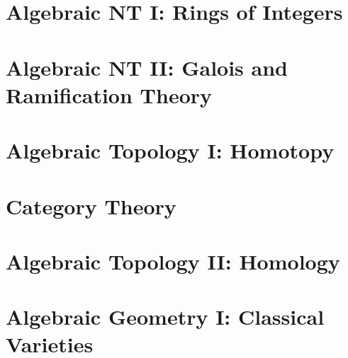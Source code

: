 \documentclass[11pt,twoside=semi,openright,numbers=noenddot]{scrbook}
\begin{document}
\part{Algebraic NT I: Rings of Integers}
\label{part:algnt1}
\parttoc







\part{Algebraic NT II: Galois and Ramification Theory}
\label{part:algnt2}
\parttoc





\part{Algebraic Topology I: Homotopy}
\label{part:algtop1}
\parttoc



\part{Category Theory}
\label{part:cats}
\parttoc



\part{Algebraic Topology II: Homology}
\label{part:algtop2}
\parttoc






\part{Algebraic Geometry I: Classical Varieties}
\label{part:ag1}
\parttoc




\end{document}
